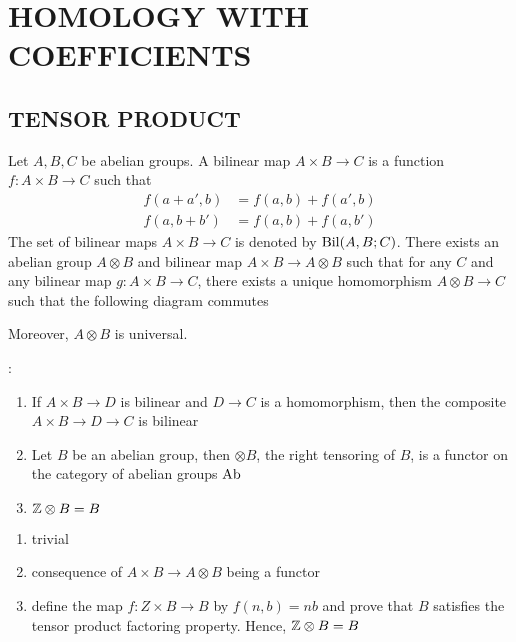\documentclass{report}
\begin{document}
\section{HOMOLOGY WITH COEFFICIENTS}

\subsection{TENSOR PRODUCT}

\begin{definition}
    Let $A, B, C$ be abelian groups. A bilinear map $A \times B \to C$ is a function $f: A \times B \to C$ such that
    \begin{align*}
        f(a + a', b) &= f(a, b) + f(a', b) \\
        f(a, b + b') &= f(a, b) + f(a, b')
    \end{align*}
    The set of bilinear maps $A \times B \to C$ is denoted by $\operatorname{Bil}(A, B; C)$. There exists an abelian group $A \otimes B$ and bilinear map $A \times B \to A \otimes B$ such that for any $C$ and any bilinear map $g: A \times B \to C$, there exists a unique homomorphism $A \otimes B \to C$ such that the following diagram commutes
    \begin{center}
    \end{center}
    Moreover, $A \otimes B$ is universal. 
\end{definition}

\begin{remark}:
    \begin{enumerate}
        \item If $A \times B \to D$ is bilinear and $D \to C$ is a homomorphism, then the composite $A \times B \to D \to C$ is bilinear
        \item Let $B$ be an abelian group, then $\otimes B$, the right tensoring of $B$, is a functor on the category of abelian groups $\operatorname{Ab}$
        \item $\mathbb{Z} \otimes B = B$
    \end{enumerate}
\end{remark}

\begin{longproof}
    \begin{enumerate}
        \item trivial
        \item consequence of $A \times B \to A \otimes B$ being a functor
        \item define the map $f: Z \times B \to B$ by $f(n, b) = nb$ and prove that $B$ satisfies the tensor product factoring property. Hence, $\mathbb{Z} \otimes B = B$
    \end{enumerate}
\end{longproof}
\end{document}
